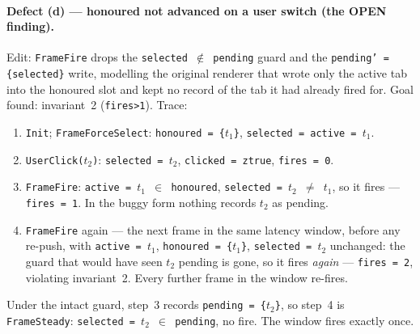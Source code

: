 \documentclass[a4paper,10pt,fleqn]{article}
\begin{document}
\paragraph{Defect (d) --- honoured not advanced on a user switch (the OPEN
finding).}
Edit: \texttt{FrameFire} drops the \texttt{selected $\notin$ pending} guard and
the \texttt{pending' = \{selected\}} write, modelling the original renderer
that wrote only the active tab into the honoured slot and kept no record of
the tab it had already fired for.  Goal found: invariant~2
(\texttt{fires>1}).  Trace:
\begin{enumerate}
  \item \texttt{Init}; \texttt{FrameForceSelect}: \texttt{honoured = \{$t_1$\}},
    \texttt{selected = active = $t_1$}.
  \item \texttt{UserClick($t_2$)}: \texttt{selected = $t_2$},
    \texttt{clicked = ztrue}, \texttt{fires = 0}.
  \item \texttt{FrameFire}: \texttt{active = $t_1$ $\in$ honoured},
    \texttt{selected = $t_2$ $\neq$ $t_1$}, so it fires --- \texttt{fires = 1}.
    In the buggy form nothing records $t_2$ as pending.
  \item \texttt{FrameFire} again --- the next frame in the same latency window,
    before any re-push, with \texttt{active = $t_1$}, \texttt{honoured =
    \{$t_1$\}}, \texttt{selected = $t_2$} unchanged: the guard that would have
    seen $t_2$ pending is gone, so it fires \emph{again} --- \texttt{fires = 2},
    violating invariant~2.  Every further frame in the window re-fires.
\end{enumerate}
Under the intact guard, step~3 records \texttt{pending = \{$t_2$\}}, so step~4
is \texttt{FrameSteady}: \texttt{selected = $t_2$ $\in$ pending}, no fire.  The
window fires exactly once.
\end{document}

